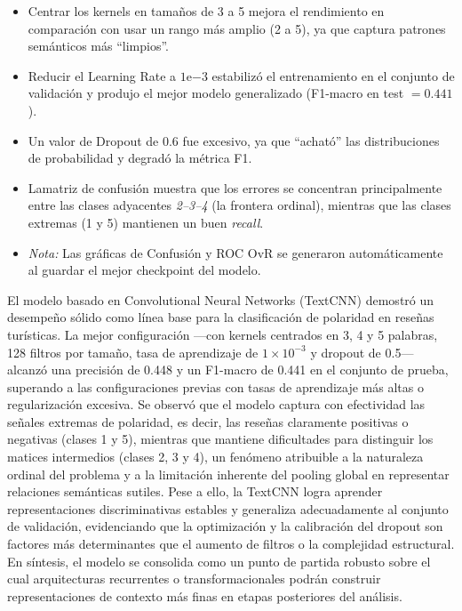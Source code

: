\begin{itemize}
    \item Centrar los kernels en tamaños de 3 a 5 mejora el rendimiento en comparación con usar un rango más amplio (2 a 5), ya que captura patrones semánticos más “limpios”.
    \item Reducir el Learning Rate a $1\mathrm{e}{-3}$ estabilizó el entrenamiento en el conjunto de validación y produjo el mejor modelo generalizado (F1-macro en test $=0.441$).
    \item Un valor de Dropout de 0.6 fue excesivo, ya que “acható” las distribuciones de probabilidad y degradó la métrica F1.
    \item Lamatriz de confusión muestra que los errores se concentran principalmente entre las clases adyacentes \emph{2–3–4} (la frontera ordinal), mientras que las clases extremas (1 y 5) mantienen un buen \emph{recall}.
    \item \emph{Nota:} Las gráficas de Confusión y ROC OvR se generaron automáticamente al guardar el mejor checkpoint del modelo.
\end{itemize}

El modelo basado en Convolutional Neural Networks (TextCNN) demostró un desempeño 
sólido como línea base para la clasificación de polaridad en reseñas turísticas. La mejor 
configuración —con kernels centrados en 3, 4 y 5 palabras, 128 filtros por tamaño, tasa de 
aprendizaje de $1\times10^{-3}$ y dropout de 0.5— alcanzó una precisión de 0.448 y un 
F1-macro de 0.441 en el conjunto de prueba, superando a las configuraciones previas con 
tasas de aprendizaje más altas o regularización excesiva. Se observó que el modelo captura
con efectividad las señales extremas de polaridad, es decir, las reseñas claramente 
positivas o negativas (clases 1 y 5), mientras que mantiene dificultades para distinguir
los matices intermedios (clases 2, 3 y 4), un fenómeno atribuible a la naturaleza ordinal
del problema y a la limitación inherente del pooling global en representar relaciones 
semánticas sutiles. Pese a ello, la TextCNN logra aprender representaciones 
discriminativas estables y generaliza adecuadamente al conjunto de validación, 
evidenciando que la optimización y la calibración del dropout son factores más 
determinantes que el aumento de filtros o la complejidad estructural. En síntesis, 
el modelo se consolida como un punto de partida robusto sobre el cual arquitecturas 
recurrentes o transformacionales podrán construir representaciones de contexto más
finas en etapas posteriores del análisis.

\clearpage